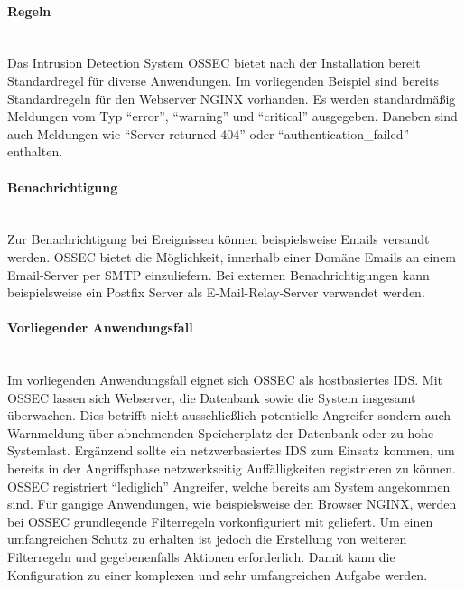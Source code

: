 \paragraph{Regeln}
\noindent \\Das Intrusion Detection System OSSEC bietet nach der Installation bereit Standardregel für diverse Anwendungen. Im vorliegenden Beispiel sind bereits Standardregeln für den Webserver NGINX vorhanden. Es werden standardmäßig Meldungen vom Typ "`error"', "`warning"' und "`critical"' ausgegeben. Daneben sind auch Meldungen wie "`Server returned 404"' oder "`authentication\_failed"' enthalten. 

\paragraph{Benachrichtigung}
\noindent \\Zur Benachrichtigung bei Ereignissen können beispielsweise Emails versandt werden. OSSEC bietet die Möglichkeit, innerhalb einer Domäne Emails an einem Email-Server per SMTP einzuliefern. Bei externen Benachrichtigungen kann beispielsweise ein Postfix Server als E-Mail-Relay-Server verwendet werden.  

\paragraph{Vorliegender Anwendungsfall}
\noindent \\Im vorliegenden Anwendungsfall eignet sich OSSEC als hostbasiertes IDS. Mit OSSEC lassen sich Webserver, die Datenbank sowie die System insgesamt überwachen. Dies betrifft nicht ausschließlich potentielle Angreifer sondern auch Warnmeldung über abnehmenden Speicherplatz der Datenbank oder zu hohe Systemlast. Ergänzend sollte ein netzwerbasiertes IDS zum Einsatz kommen, um bereits in der Angriffsphase netzwerkseitig Auffälligkeiten registrieren zu können. OSSEC registriert "`lediglich"' Angreifer, welche bereits am System angekommen sind. Für gängige Anwendungen, wie beispielsweise den Browser NGINX, werden bei OSSEC grundlegende Filterregeln vorkonfiguriert mit geliefert. Um einen umfangreichen Schutz zu erhalten ist jedoch die Erstellung von weiteren Filterregeln und gegebenenfalls Aktionen erforderlich. Damit kann die Konfiguration zu einer komplexen und sehr umfangreichen Aufgabe werden. 
